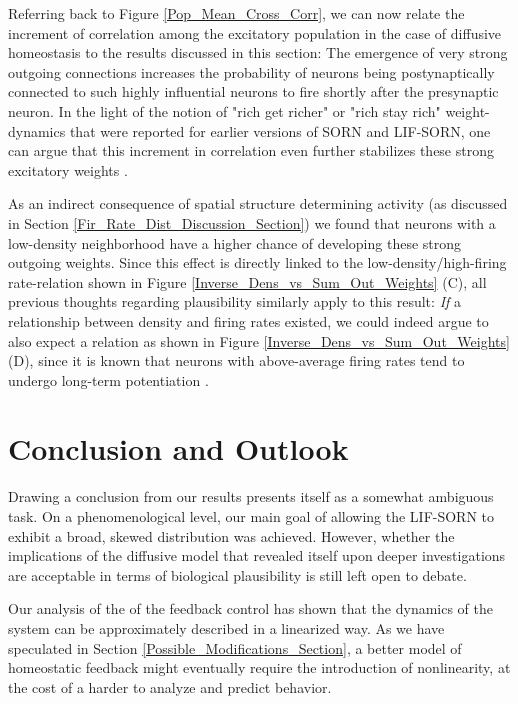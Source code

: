 \documentclass[10pt,a4paper]{article}
\begin{document}
Referring back to Figure \ref{Pop_Mean_Cross_Corr}, we can now relate the increment of correlation among the excitatory population in the case of diffusive homeostasis to the results discussed in this section: The emergence of very strong outgoing connections increases the probability of neurons being postynaptically connected to such highly influential neurons to fire shortly after the presynaptic neuron. In the light of the notion of "rich get richer" or "rich stay rich" weight-dynamics that were reported for earlier versions of SORN and LIF-SORN, one can argue that this increment in correlation even further stabilizes these strong excitatory weights \cite{Pengsheng_2013,SORN_Paper}.

As an indirect consequence of spatial structure determining activity (as discussed in Section \ref{Fir_Rate_Dist_Discussion_Section}) we found that neurons with a low-density neighborhood have a higher chance of developing these strong outgoing weights. Since this effect is directly linked to the low-density/high-firing rate-relation shown in Figure \ref{Inverse_Dens_vs_Sum_Out_Weights} (C), all previous thoughts regarding plausibility similarly apply to this result: \emph{If} a relationship between density and firing rates existed, we could indeed argue to also expect a relation as shown in Figure \ref{Inverse_Dens_vs_Sum_Out_Weights} (D), since it is known that neurons with above-average firing rates tend to undergo long-term potentiation \cite{Sjoestroem_Syn_Plasticity_2001,Feldman_STDP_2012}.

\newpage
\section{Conclusion and Outlook}\label{Conclusion_Section}
Drawing a conclusion from our results presents itself as a somewhat ambiguous task. On a phenomenological level, our main goal of allowing the LIF-SORN to exhibit a broad, skewed distribution was achieved. However, whether the implications of the diffusive model that revealed itself upon deeper investigations are acceptable in terms of biological plausibility is still left open to debate.

Our analysis of the of the feedback control has shown that the dynamics of the system can be approximately described in a linearized way. As we have speculated in Section \ref{Possible_Modifications_Section}, a better model of homeostatic feedback might eventually require the introduction of nonlinearity, at the cost of a harder to analyze and predict behavior. 
\end{document}
